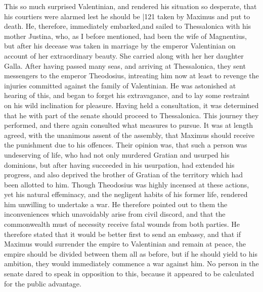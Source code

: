 This so much surprised Valentinian, and rendered his situation so desperate, that his courtiers were alarmed lest he should be
|121 taken by Maximus and put to death. He, therefore, immediately embarked,and sailed to Thessalonica with his mother Justina, who, as I before mentioned, had been the wife of Magnentius, but after his decease was taken in marriage by the emperor Valentinian on account of her extraordinary beauty. She carried along with her her daughter Galla. After having passed many seas, and arriving at Thessalonica, they sent messengers to the emperor Theodosius, intreating him now at least to revenge the injuries committed against the family of Valentinian. He was astonished at hearing of this, and began to forget his extravagance, and to lay some restraint on his wild inclination for pleasure. Having held a consultation, it was determined that he with part of the senate should proceed to Thessalonica. This journey they performed, and there again consulted what measures to pursue. It was at length agreed, with the unanimous assent of the assembly, that Maximus should receive the punishment due to his offences. Their opinion was, that such a person was undeserving of life, who had not only murdered Gratian and usurped his dominions, but after having succeeded in his usurpation, had extended his progress, and also deprived the brother of Gratian of the territory which had been allotted to him. Though Theodosius was highly incensed at these actions, yet his natural effeminacy, and the negligent habits of his former life, rendered him unwilling to undertake a war. He therefore pointed out to them the inconveniences which unavoidably arise from civil discord, and that the commonwealth must of necessity receive fatal wounds from both parties. He therefore stated that it would be better first to send an embassy, and that if Maximus would surrender the empire to Valentinian and remain at peace, the empire should be divided between them all as before, but if he should yield to his ambition, they would immediately commence a war against him. No person in the senate dared to speak in opposition to this, because it appeared to be calculated for the public advantage.

